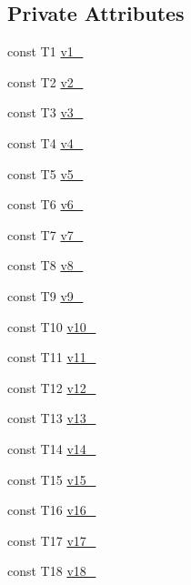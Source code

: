 \subsection*{\-Private \-Attributes}
\begin{DoxyCompactItemize}
\item 
const \-T1 \hyperlink{classtesting_1_1internal_1_1ValueArray18_aac1d0654cc6c1aceb4a5d0fa7a98042e}{v1\-\_\-}
\item 
const \-T2 \hyperlink{classtesting_1_1internal_1_1ValueArray18_a9f0a8ce6ce2fd27e980c4c51a7a7256a}{v2\-\_\-}
\item 
const \-T3 \hyperlink{classtesting_1_1internal_1_1ValueArray18_a4f8257321a2eab0456239174d6712d5e}{v3\-\_\-}
\item 
const \-T4 \hyperlink{classtesting_1_1internal_1_1ValueArray18_aac184059fee257381ccae81d8d112f85}{v4\-\_\-}
\item 
const \-T5 \hyperlink{classtesting_1_1internal_1_1ValueArray18_a1f3e0ada8419ed2e17cc61e6c0c54404}{v5\-\_\-}
\item 
const \-T6 \hyperlink{classtesting_1_1internal_1_1ValueArray18_a13d84d5824617bbc6fb1a6b3ee3cb745}{v6\-\_\-}
\item 
const \-T7 \hyperlink{classtesting_1_1internal_1_1ValueArray18_a4063f0b7a528133d018ee488ba44a9a3}{v7\-\_\-}
\item 
const \-T8 \hyperlink{classtesting_1_1internal_1_1ValueArray18_a596bc5260b2474271d1f6910ff6f665d}{v8\-\_\-}
\item 
const \-T9 \hyperlink{classtesting_1_1internal_1_1ValueArray18_a6356e16cf54a9dfac8525f20242af31e}{v9\-\_\-}
\item 
const \-T10 \hyperlink{classtesting_1_1internal_1_1ValueArray18_a147ca4457ea439b00a93087231ff77ef}{v10\-\_\-}
\item 
const \-T11 \hyperlink{classtesting_1_1internal_1_1ValueArray18_a12a4baf9ab57c7e9b5b4f1612e59e529}{v11\-\_\-}
\item 
const \-T12 \hyperlink{classtesting_1_1internal_1_1ValueArray18_a35ffe6d4d723857722ab319a235eddfc}{v12\-\_\-}
\item 
const \-T13 \hyperlink{classtesting_1_1internal_1_1ValueArray18_a8c6e803e306975fc3ed6717875688efa}{v13\-\_\-}
\item 
const \-T14 \hyperlink{classtesting_1_1internal_1_1ValueArray18_a812dbcac0513d6c5242ff4df1b8da6dd}{v14\-\_\-}
\item 
const \-T15 \hyperlink{classtesting_1_1internal_1_1ValueArray18_ab34fb63edf7d2b53ddbf7ac163123da0}{v15\-\_\-}
\item 
const \-T16 \hyperlink{classtesting_1_1internal_1_1ValueArray18_a8b2b80d31925c1583c3e694d2bf235c5}{v16\-\_\-}
\item 
const \-T17 \hyperlink{classtesting_1_1internal_1_1ValueArray18_a9f59ea9e6f3642f77227dd1f7882d649}{v17\-\_\-}
\item 
const \-T18 \hyperlink{classtesting_1_1internal_1_1ValueArray18_ad07972ee98135c8deb090fc891a04e3e}{v18\-\_\-}
\end{DoxyCompactItemize}



